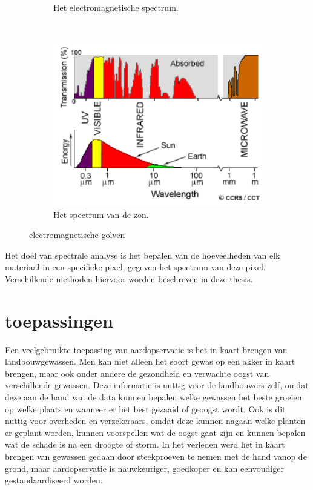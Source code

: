 \documentclass[12pt]{report}
\newcommand{\rulesep}{\unskip\ \vrule height -1ex\ }
\begin{document}
\begin{figure}
\begin{subfigure}[b]{0.2\textwidth}
\caption{Het electromagnetische spectrum. \label{fig:spec}}
\end{subfigure}\rulesep
\begin{subfigure}[b]{0.4\textwidth}
\includegraphics[width=\textwidth]{spec2.PNG}
\caption{Het spectrum van de zon. \label{fig:specs}}
\end{subfigure}
\caption{electromagnetische golven}
\end{figure}


Het doel van spectrale analyse is het bepalen van de hoeveelheden van elk materiaal in een specifieke pixel, gegeven het spectrum van deze pixel. Verschillende methoden hiervoor worden beschreven in deze thesis. 


\section{toepassingen}


Een veelgebruikte toepassing van aardopservatie is het in kaart brengen van landbouwgewassen\cite{fun}. Men kan niet alleen het soort gewas op een akker in kaart brengen, maar ook onder andere de gezondheid en verwachte oogst van verschillende gewassen. Deze informatie is nuttig voor de landbouwers zelf, omdat deze aan de hand van de data kunnen bepalen welke gewassen het beste groeien op welke plaats en wanneer er het best gezaaid of geoogst wordt. Ook is dit nuttig voor overheden en verzekeraars, omdat deze kunnen nagaan welke planten er geplant worden, kunnen voorspellen wat de oogst gaat zijn en kunnen bepalen wat de schade is na een droogte of storm. In het verleden werd het in kaart brengen van gewassen gedaan door steekproeven te nemen met de hand vanop de grond, maar aardopservatie is nauwkeuriger, goedkoper en kan eenvoudiger gestandaardiseerd worden. 
\end{document}
